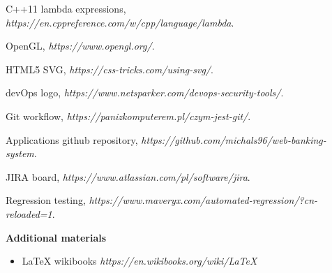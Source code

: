 \documentclass[a4paper,12pt]{book}
\begin{document}
\begin{thebibliography}{9}
  C++11 lambda expressions,
  \emph{https://en.cppreference.com/w/cpp/language/lambda}.
  
  OpenGL,
  \emph{https://www.opengl.org/}.
  
  HTML5 SVG,
  \emph{https://css-tricks.com/using-svg/}.

  devOps logo,
  \emph{https://www.netsparker.com/devops-security-tools/}.
  
  Git workflow,
  \emph{https://panizkomputerem.pl/czym-jest-git/}.
  
  Applications github repository,
  \emph{https://github.com/michals96/web-banking-system}.   

  JIRA board,
  \emph{https://www.atlassian.com/pl/software/jira}.   
  
  Regression testing,
  \emph{https://www.maveryx.com/automated-regression/?cn-reloaded=1}. 
\end{thebibliography}

\textbf{Additional materials} \begin{itemize}
	\item LaTeX wikibooks \newline \textit{https://en.wikibooks.org/wiki/LaTeX}

\end{itemize}

\linespread{1.3}
\selectfont
\end{document}
